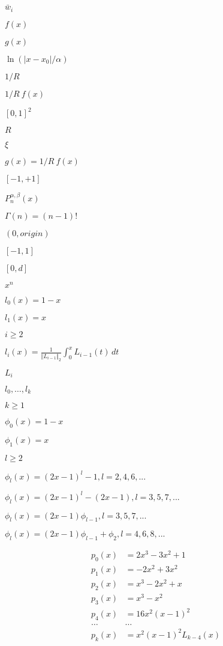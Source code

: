 \documentclass{article}
\begin{document}
$\bar{w}_i$
\pagebreak

$f(x)$
\pagebreak

$g(x)$
\pagebreak

$\ln(|x-x_0|/\alpha)$
\pagebreak

$1/R$
\pagebreak

$1/R \ f(x)$
\pagebreak

$[0,1]^2$
\pagebreak

$R$
\pagebreak

$\xi$
\pagebreak

$g(x) = 1/R\ f(x)$
\pagebreak

$[-1, +1]$
\pagebreak

$ P^{\alpha, \beta}_n(x) $
\pagebreak

$ \Gamma(n) = (n-1)! $
\pagebreak

$(0,origin)$
\pagebreak

$[-1,1]$
\pagebreak

$[0,d]$
\pagebreak

$x^n$
\pagebreak

$l_0(x) = 1-x$
\pagebreak

$l_1(x) = x$
\pagebreak

$i\geq2$
\pagebreak

$l_i(x) = \frac{1}{\Vert L_{i-1}\Vert_2}\int_0^x L_{i-1}(t)\,dt$
\pagebreak

$L_i$
\pagebreak

$l_0,\ldots,l_k$
\pagebreak

$k\geq 1$
\pagebreak

$\phi_{0}(x) = 1 - x$
\pagebreak

$\phi_{1}(x) = x$
\pagebreak

$l \geq 2$
\pagebreak

$\phi_{l}(x) = (2x-1)^l - 1, l = 2,4,6,...$
\pagebreak

$\phi_{l}(x) = (2x-1)^l - (2x-1), l = 3,5,7,...$
\pagebreak

$\phi_{l}(x) = (2x-1)\phi_{l-1}, l=3,5,7,...$
\pagebreak

$\phi_{l}(x) = (2x-1)\phi_{l-1} + \phi_{2}, l=4,6,8,...$
\pagebreak

\begin{align*} p_0(x) &= 2x^3-3x^2+1 \\ p_1(x) &= -2x^2+3x^2 \\ p_2(x) &= x^3-2x^2+x \\ p_3(x) &= x^3-x^2 \\ p_4(x) &= 16x^2(x-1)^2 \\ \ldots & \ldots \\ p_k(x) &= x^2(x-1)^2 L_{k-4}(x) \end{align*}
\pagebreak
\end{document}
